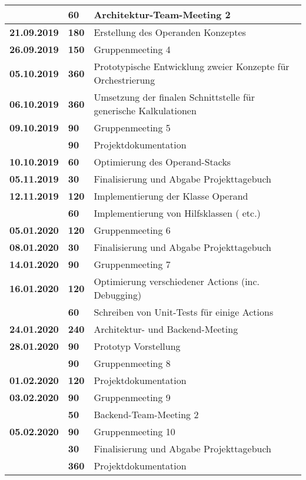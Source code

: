 {\begin{longtable}{|l|l|p{11cm}|}
			& \textbf{\hfill 60} & Architektur-Team-Meeting 2
		\\ \hline \textbf{21.09.2019}
			& \textbf{\hfill 180} & Erstellung des Operanden Konzeptes
		\\ \hline \textbf{26.09.2019}
			& \textbf{\hfill 150} & Gruppenmeeting 4
		\\ \hline \textbf{05.10.2019}
			& \textbf{\hfill 360} & Prototypische Entwicklung zweier Konzepte für Orchestrierung
		\\ \hline \textbf{06.10.2019}
			& \textbf{\hfill 360} & Umsetzung der finalen Schnittstelle für generische Kalkulationen
		\\ \hline \textbf{09.10.2019}
			& \textbf{\hfill 90} & Gruppenmeeting 5 \\\cline{2-3}
			& \textbf{\hfill 90} & Projektdokumentation
		\\ \hline \textbf{10.10.2019}
			& \textbf{\hfill 60} & Optimierung des Operand-Stacks
		\\ \hline \textbf{05.11.2019}
			& \textbf{\hfill 30} & Finalisierung und Abgabe Projekttagebuch
		\\ \hline \textbf{12.11.2019}
		& \textbf{\hfill 120} & Implementierung der Klasse Operand \\\cline{2-3}
		& \textbf{\hfill 60} & Implementierung von Hilfsklassen (\code{DoubleComparator} etc.)
		\\ \hline \textbf{05.01.2020}
			& \textbf{\hfill 120} & Gruppenmeeting 6
		\\ \hline \textbf{08.01.2020}
			& \textbf{\hfill 30} & Finalisierung und Abgabe Projekttagebuch
		\\ \hline \textbf{14.01.2020}
			& \textbf{\hfill 90} & Gruppenmeeting 7
		\\ \hline \textbf{16.01.2020}
			& \textbf{\hfill 120} & Optimierung verschiedener Actions (inc. Debugging) \\\cline{2-3}
			& \textbf{\hfill 60} & Schreiben von Unit-Tests für einige Actions
		\\ \hline \textbf{24.01.2020}
			& \textbf{\hfill 240} & Architektur- und Backend-Meeting
		\\ \hline \textbf{28.01.2020}
			& \textbf{\hfill 90} & Prototyp Vorstellung \\\cline{2-3}
			& \textbf{\hfill 90} & Gruppenmeeting 8
		\\ \hline \textbf{01.02.2020}
			& \textbf{\hfill 120} & Projektdokumentation
		\\ \hline \textbf{03.02.2020}
			& \textbf{\hfill 90} & Gruppenmeeting 9 \\\cline{2-3}
			& \textbf{\hfill 50} & Backend-Team-Meeting 2
		\\ \hline \textbf{05.02.2020}
			& \textbf{\hfill 90} & Gruppenmeeting 10 \\\cline{2-3}
			& \textbf{\hfill 30} & Finalisierung und Abgabe Projekttagebuch \\\cline{2-3}
			& \textbf{\hfill 360} & Projektdokumentation \\
		\hline\hline
	\end{longtable}
}

